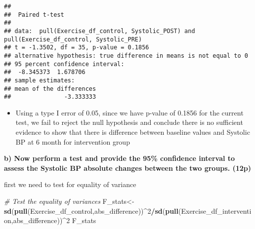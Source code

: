 \documentclass[]{article}
\newenvironment{Shaded}{\begin{snugshade}}{\end{snugshade}}
\newcommand{\CommentTok}[1]{\textcolor[rgb]{0.56,0.35,0.01}{\textit{#1}}}
\newcommand{\DataTypeTok}[1]{\textcolor[rgb]{0.13,0.29,0.53}{#1}}
\newcommand{\DecValTok}[1]{\textcolor[rgb]{0.00,0.00,0.81}{#1}}
\newcommand{\KeywordTok}[1]{\textcolor[rgb]{0.13,0.29,0.53}{\textbf{#1}}}
\newcommand{\NormalTok}[1]{#1}
\newcommand{\OperatorTok}[1]{\textcolor[rgb]{0.81,0.36,0.00}{\textbf{#1}}}
\newcommand{\StringTok}[1]{\textcolor[rgb]{0.31,0.60,0.02}{#1}}
\providecommand{\tightlist}{%
  \setlength{\itemsep}{0pt}\setlength{\parskip}{0pt}}
\begin{document}
\begin{verbatim}
## 
##  Paired t-test
## 
## data:  pull(Exercise_df_control, Systolic_POST) and pull(Exercise_df_control, Systolic_PRE)
## t = -1.3502, df = 35, p-value = 0.1856
## alternative hypothesis: true difference in means is not equal to 0
## 95 percent confidence interval:
##  -8.345373  1.678706
## sample estimates:
## mean of the differences 
##               -3.333333
\end{verbatim}

\begin{itemize}
\tightlist
\item
  Using a type I error of 0.05, since we have p-value of 0.1856 for the
  current test, we fail to reject the null hypothesis and conclude there
  is no sufficient evidence to show that there is difference between
  baseline values and Systolic BP at 6 month for intervention group
\end{itemize}

\textbf{b) Now perform a test and provide the 95\% confidence interval
to assess the Systolic BP absolute changes between the two groups.
(12p)}

\begin{Shaded}
\end{Shaded}

first we need to test for equality of variance

\begin{Shaded}
\begin{Highlighting}[]
\CommentTok{# Test the equality of variances}
\NormalTok{F_stats<-}\KeywordTok{sd}\NormalTok{(}\KeywordTok{pull}\NormalTok{(Exercise_df_control,abs_difference))}\OperatorTok{^}\DecValTok{2}\OperatorTok{/}\KeywordTok{sd}\NormalTok{(}\KeywordTok{pull}\NormalTok{(Exercise_df_intervention,abs_difference))}\OperatorTok{^}\DecValTok{2}
\NormalTok{F_stats}
\end{Highlighting}
\end{Shaded}
\end{document}
